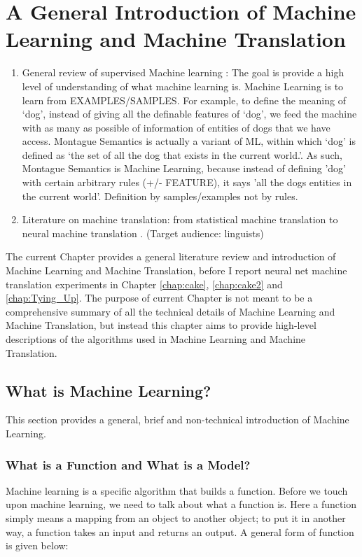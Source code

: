 \chapter{A General Introduction of Machine Learning and Machine Translation}
\label{chap:MT}

	\begin{enumerate}
	\item General review of supervised Machine learning \citep{kotsiantis2007supervised}: The goal is provide a high level of understanding of what machine learning is. Machine Learning is to learn from EXAMPLES/SAMPLES. For example, to define the meaning of `dog', instead of giving all the definable features of `dog', we feed the machine with as many as possible of information of entities of dogs that we have access. Montague Semantics is actually a variant of ML, within which `dog' is defined as `the set of all the dog that exists in the current world.'. As such, Montague Semantics is Machine Learning, because instead of defining 'dog' with certain arbitrary rules (+/- FEATURE), it says 'all the dogs entities in the current world'. Definition by samples/examples not by rules.    
	\item Literature on machine translation: from statistical machine translation \citep{koehn2009statistical} to neural machine translation \citep{cho2014learning,cho2014properties,bahdanau2014neural, Koehn_NMT2017}. (Target audience: linguists)
	\end{enumerate}

The current Chapter provides a general literature review and introduction of Machine Learning and Machine Translation, before I report neural net machine translation experiments in Chapter \ref{chap:cake}, \ref{chap:cake2} and \ref{chap:Tying_Up}. The purpose of current Chapter is not meant to be a comprehensive summary of all the technical details of Machine Learning and Machine Translation, but instead this chapter aims to provide high-level descriptions of the algorithms used in Machine Learning and Machine Translation. 

\section{What is Machine Learning?}

This section provides a general, brief and non-technical introduction of Machine Learning.

\subsection{What is a Function and What is a Model?}
Machine learning is a specific algorithm that builds a function. Before we touch upon machine learning, we need to talk about what a function is. Here a function simply means a mapping from an object to another object; to put it in another way, a function takes an input and returns an output. A general form of function is given below:


